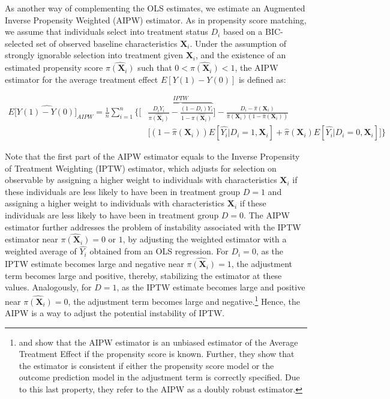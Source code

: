 As another way of complementing the OLS estimates, we estimate an Augmented Inverse Propensity Weighted (AIPW) estimator. As in propensity score matching, we assume that individuals select into treatment status $D_i$ based on a BIC-selected set of observed baseline characteristics $\boldsymbol{X}_i$. Under the assumption of strongly ignorable selection into treatment given $\boldsymbol{X}_i$, and the existence of an estimated propensity score $\hat{\pi({\boldsymbol{X}_i})}$ such that $0<\hat{\pi({\boldsymbol{X}_i})}<1$, the AIPW estimator for the average treatment effect $E[Y(1)-Y(0)]$ is defined as:

\begin{align}\label{eq:AIPW}
E[\widehat{Y(1)-Y(0)]}_{AIPW} = \frac{1}{n} \sum_{i=1}^{n} \bigg \{ \bigg[ & \overbrace{\frac{D_i Y_i}{\hat{\pi(\boldsymbol{X}_i)}} - \frac{(1-D_i)Y_i}{1-\hat{\pi(\boldsymbol{X}_i)}}}^{IPTW} \bigg]- \frac{D_i - \hat{\pi}(\boldsymbol{X}_i)}{\hat{\pi}(\boldsymbol{X}_i) (1-\hat{\pi}(\boldsymbol{X}_i))} \nonumber \\[10pt]
& \bigg[ (1-\hat{\pi}(\boldsymbol{X}_i)) E[\hat{Y_i}|D_i=1,\boldsymbol{X}_i] + \hat{\pi}(\boldsymbol{X}_i) E[\hat{Y_i}|D_i=0,\boldsymbol{X}_i] \bigg] \bigg \}
\end{align}

Note that the first part of the AIPW estimator equals to the Inverse Propensity of Treatment Weighting (IPTW) estimator, which adjusts for selection on observable by assigning a higher weight to individuals with characteristics $\boldsymbol{X}_i$ if these individuals are less likely to have been in treatment group $D = 1$ and assigning a higher weight to individuals with characteristics $\boldsymbol{X}_i$ if these individuals are less likely to have been in treatment group $D = 0$. The AIPW estimator further addresses the problem of instability associated with the IPTW estimator near $\hat{\pi(\boldsymbol{X}_i)} = 0$ or $1$, by adjusting the weighted estimator with a weighted average of $\hat{Y_i}$ obtained from an OLS regression. For $D_i = 0$, as the IPTW estimate becomes large and negative near $\hat{\pi(\boldsymbol{X}_i)} = 1$, the adjustment term becomes large and positive, thereby, stabilizing the estimator at these values. Analogously, for $D = 1$, as the IPTW estimate becomes large and positive near $\hat{\pi(\boldsymbol{X}_i)} = 0$, the adjustment term becomes large and negative.\footnote{\citet{Tsiatis_2006_Semiparametric-Theory} and \citet{Glynn-Quinn_2010_Political-Analysis} show that the AIPW estimator is an unbiased estimator of the Average Treatment Effect if the propensity score is known. Further, they show that the estimator is consistent if either the propensity score model or the outcome prediction model in the adjustment term is correctly specified. Due to this last property, they refer to the AIPW as a doubly robust estimator.}  Hence, the AIPW is a way to adjust the potential instability of IPTW.


